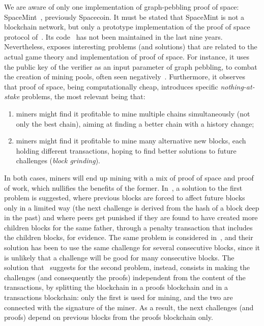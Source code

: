 We are aware of only one implementation of graph-pebbling proof of space:
SpaceMint~\cite{ParkKFGAP18}, previously Spacecoin.
It must be stated that SpaceMint is not a blockchain network,
but only a prototype implementation of the proof of space protocol of~\cite{DziembowskiFKP15}.
Its code~\cite{SpaceMintCode} has not been maintained in the last nine years.
Nevertheless, \cite{ParkKFGAP18} exposes interesting problems (and solutions)
that are related to the actual game theory and implementation of proof of space.
For instance, it uses the public key of the verifier as an input parameter
of graph pebbling, to combat the creation of mining pools, often seen
negatively~\cite{MillerKKS15}.
Furthermore, it observes that proof of space, being computationally cheap, introduces
specific \emph{nothing-at-stake} problems, the most relevant being that:
%
\begin{enumerate}
\item miners might find it profitable to mine multiple chains simultaneously (not only the best chain),
  aiming at finding a better chain with a history change;
\item miners might find it profitable to mine many alternative new blocks, each holding
  different transactions, hoping to find better solutions to future challenges (\emph{block grinding}).
\end{enumerate}
%
In both cases, miners will end up mining with a mix of proof of space and proof of work,
which nullifies the benefits of the former.
In~\cite{ParkKFGAP18}, a solution to the first problem is suggested, where
previous blocks are forced to affect future blocks only in a limited way
(the next challenge is derived from the hash of a block deep in the past)
and where peers get punished if they are found to have
created more children blocks for the same father, through a penalty transaction that
includes the children blocks, for evidence.
The same problem is considered in~\cite{CohenP19}, and their solution has been
to use the same challenge for several consecutive blocks, since it is
unlikely that a challenge will be good for many consecutive blocks.
The solution that~\cite{ParkKFGAP18} suggests
for the second problem, instead, consists in making the challenges
(and consequently the proofs) independent from the content of the transactions, by splitting the
blockchain in a proofs blockchain and in a transactions blockchain: only the first is used for mining,
and the two are connected with the signature of the miner.
As a result, the next challenges (and proofs) depend on previous blocks from the proofs blockchain only.
